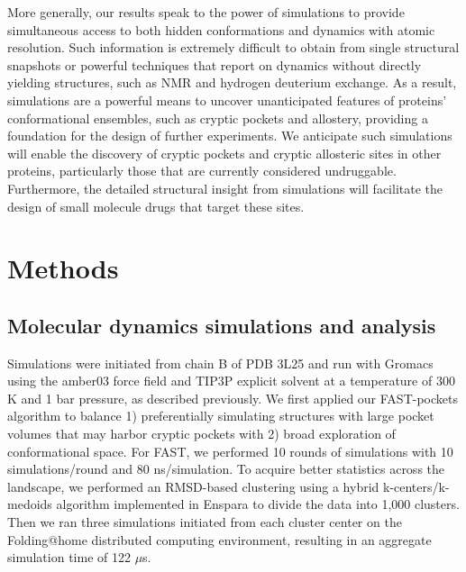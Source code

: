 \documentclass[../main.tex]{subfiles}
\begin{document}
    More generally, our results speak to the power of simulations to provide simultaneous access to both hidden conformations and dynamics with atomic resolution. Such information is extremely difficult to obtain from single structural snapshots or powerful techniques that report on dynamics without directly yielding structures, such as NMR and hydrogen deuterium exchange. As a result, simulations are a powerful means to uncover unanticipated features of proteins’ conformational ensembles, such as cryptic pockets and allostery, providing a foundation for the design of further experiments. We anticipate such simulations will enable the discovery of cryptic pockets and cryptic allosteric sites in other proteins, particularly those that are currently considered undruggable. Furthermore, the detailed structural insight from simulations will facilitate the design of small molecule drugs that target these sites.

\section{Methods}
    \subsection{Molecular dynamics simulations and analysis}
        Simulations were initiated from chain B of PDB 3L25\cite{leung_structural_2010} and run with Gromacs\cite{VanDerSpoel:2005hz} using the amber03 force field\cite{Duan:2003gt} and TIP3P explicit solvent\cite{Jorgensen:1983fl} at a temperature of 300 K and 1 bar pressure, as described previously\cite{Hart:2016kb}. We first applied our FAST-pockets algorithm\cite{zimmerman_fast_2015} to balance 1) preferentially simulating structures with large pocket volumes that may harbor cryptic pockets with 2) broad exploration of conformational space. For FAST, we performed 10 rounds of simulations with 10 simulations/round and 80 ns/simulation. To acquire better statistics across the landscape, we performed an RMSD-based clustering using a hybrid k-centers/k-medoids algorithm\cite{Beauchamp:2011he} implemented in Enspara\cite{porter2018enspara} to divide the data into 1,000 clusters. Then we ran three simulations initiated from each cluster center on the Folding@home distributed computing environment, resulting in an aggregate simulation time of 122 $\mu$s.
\end{document}
